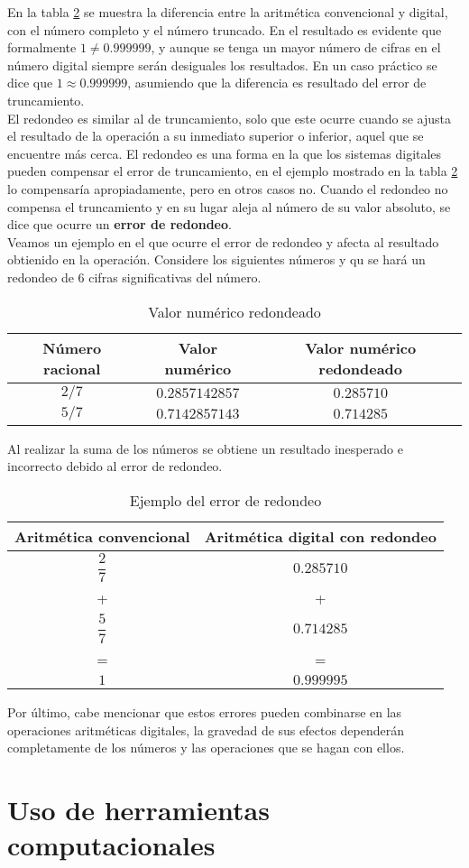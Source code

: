 En la tabla \ref{table:errorTruncamiento} se muestra la diferencia entre la aritmética convencional y digital, con el número completo y el número truncado. 
En el resultado es evidente que  formalmente $1\not= 0.999999$, y aunque se tenga un mayor número de cifras en el número digital siempre serán desiguales 
los resultados. En un caso práctico se dice que $1\approx 0.999999$, asumiendo que la diferencia es resultado del error de truncamiento.\\

El redondeo es similar al de truncamiento, solo que este ocurre cuando se ajusta el resultado de la operación a su inmediato superior o inferior, aquel que se
encuentre más cerca. El redondeo es una forma en la que los sistemas digitales pueden compensar el error de truncamiento, en el ejemplo mostrado en la tabla 
\ref{table:errorTruncamiento} lo compensaría apropiadamente, pero en otros casos no. Cuando el redondeo no compensa el truncamiento y en su lugar aleja al 
número de su valor absoluto, se dice que ocurre un \textbf{error de redondeo}. \\

Veamos un ejemplo en el que ocurre el error de redondeo y afecta al resultado obtienido en la operación. Considere los siguientes números y qu se hará
un redondeo de 6 cifras significativas del número.

\begin{table}[ht]
	\centering
	\begin{tabular}{c|c|c}
	\textbf{Número racional} & \textbf{Valor numérico} & \textbf{Valor numérico redondeado}\\
	\hline
	$2/7$ & $0.2857142857$ & $0.285710$\\
	$5/7$ & $0.7142857143$ & $0.714285$	
	\end{tabular}
	\caption{Valor numérico redondeado}
	\label{table:errorRedondeo}
\end{table}

Al realizar la suma de los números se obtiene un resultado inesperado e incorrecto debido al error de redondeo.

\begin{table}[ht]
	\centering
	\begin{tabular}{c|c}
	\textbf{Aritmética convencional} & \textbf{Aritmética digital con redondeo}\\
	\hline
	$\dfrac{2}{7}$ & $0.285710$\\
	+ & + \\
	$\dfrac{5}{7}$ & $0.714285$\\
	= & = \\
	$1$ & $0.999995$		
	\end{tabular}
	\caption{Ejemplo del error de redondeo}
	\label{table:errorTruncamiento}
\end{table}

Por último, cabe mencionar que estos errores pueden combinarse en las operaciones aritméticas digitales, la gravedad de sus efectos dependerán completamente 
de los números y las operaciones que se hagan con ellos.

\section{Uso de herramientas computacionales}
  





